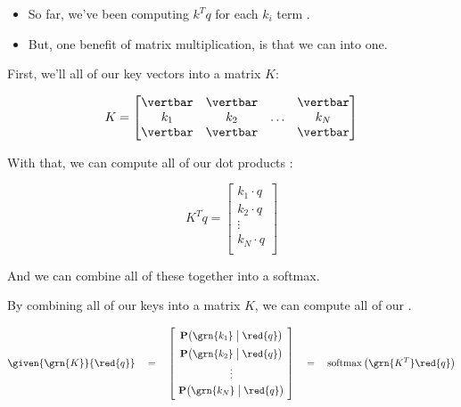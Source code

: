         \begin{itemize}
            \item So far, we've been computing $k^Tq$ for each $k_i$ term .

            \item But, one benefit of matrix multiplication, is that we can  into one.
        \end{itemize}

        First, we'll  all of our key vectors into a matrix $K$:

        \begin{equation}
            K = 
            \begin{bmatrix}
                \vertbar & \vertbar  & \     & \vertbar \\
                k_1 & k_2 & \ldots & k_N \\
                \vertbar & \vertbar  &        & \vertbar
            \end{bmatrix}
        \end{equation}

        With that, we can compute all of our dot products :

        \begin{equation}
            K^Tq = 
            \begin{bmatrix}
                k_1 \cdot q \\ k_2 \cdot q \\ \vdots \\ k_N \cdot q \\
            \end{bmatrix}
        \end{equation}

        And we can combine all of these together into a softmax.\\

        \begin{kequation}
            By combining all of our keys into a matrix $K$, we can compute all of our  .

            \begin{equation*}
                \given{ \grn{K} }{ \red{q} }  \quad=\quad
                \begin{bmatrix}
                    \phantom{\Big|} 
                    \mathbf{P} \big( \grn{k_1} \;\big|\; \red{q} \big) \phantom{\Big|} \\
                    \phantom{\Big|}
                    \mathbf{P} \big( \grn{k_2} \;\big|\; \red{q} \big) 
                    \phantom{\Big|}\\
                    \vdots \\
                    \phantom{\Big|}
                    \mathbf{P} \big( \grn{k_N} \;\big|\; \red{q} \big) 
                    \phantom{\Big|}\\
                \end{bmatrix}
                \quad=\quad
                \operatorname{softmax} \big( \grn{K^T}\red{q} \big)
            \end{equation*}
        \end{kequation}



